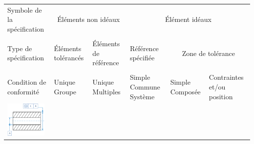 \documentclass[11pt,oneside]{article}
\begin{document}
\begin{exemple}
\footnotesize{
\begin{center}
\begin{tabular}{|p{}|p{}|p{}|p{}|p{}|p{}|}
\hline
Symbole de la spécification & 
\multicolumn{2}{c|}{Éléments non idéaux} &
\multicolumn{3}{c|}{Élément idéaux} \\
&
\multicolumn{2}{c|}{} &
\multicolumn{3}{c|}{}\\
\hline
Type de spécification & 
Éléments tolérancés &
Éléments de référence & 
Référence spécifiée & 
\multicolumn{2}{c|}{Zone de tolérance} \\
&&&&
\multicolumn{2}{c|}{}\\
\hline
Condition de conformité & 
Unique Groupe & Unique Multiples &
Simple Commune Système &
Simple Composée & 
Contraintes et/ou position \\
\hline
\multirow{12}{*}{\includegraphics[width=2cm]{png/ex_coax}}&&&&&\\
&&&&&\\
&&&&&\\
&&&&&\\
&&&&&\\
&&&&&\\
&&&&&\\
&&&&&\\
&&&&&\\
&&&&&\\
&&&&&\\
&&&&&\\
\hline
\end{tabular}
\end{center}
}
\end{exemple}
\end{document}
